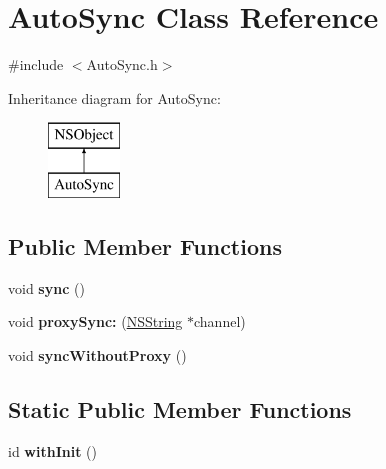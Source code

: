 \hypertarget{interface_auto_sync}{
\section{\-Auto\-Sync \-Class \-Reference}
\label{interface_auto_sync}
}


{\ttfamily \#include $<$\-Auto\-Sync.\-h$>$}

\-Inheritance diagram for \-Auto\-Sync\-:\begin{figure}[H]
\begin{center}
\leavevmode
\includegraphics[height=2.000000cm]{interface_auto_sync}
\end{center}
\end{figure}
\subsection*{\-Public \-Member \-Functions}
\begin{DoxyCompactItemize}
\item 
\hypertarget{interface_auto_sync_a6cfa02702aee2cbab3bd3aac5bd4e85a}{
void {\bfseries sync} ()}
\label{interface_auto_sync_a6cfa02702aee2cbab3bd3aac5bd4e85a}

\item 
\hypertarget{interface_auto_sync_a2705463f927f7f963182ac5cf69cd0ba}{
void {\bfseries proxy\-Sync\-:} (\hyperlink{class_n_s_string}{\-N\-S\-String} $\ast$channel)}
\label{interface_auto_sync_a2705463f927f7f963182ac5cf69cd0ba}

\item 
\hypertarget{interface_auto_sync_af709112bb5c82d4ea38690dba6e394e5}{
void {\bfseries sync\-Without\-Proxy} ()}
\label{interface_auto_sync_af709112bb5c82d4ea38690dba6e394e5}

\end{DoxyCompactItemize}
\subsection*{\-Static \-Public \-Member \-Functions}
\begin{DoxyCompactItemize}
\item 
\hypertarget{interface_auto_sync_ae9d2e39a2d0b59ac270dd9aa38c7f3bc}{
id {\bfseries with\-Init} ()}
\label{interface_auto_sync_ae9d2e39a2d0b59ac270dd9aa38c7f3bc}

\end{DoxyCompactItemize}


